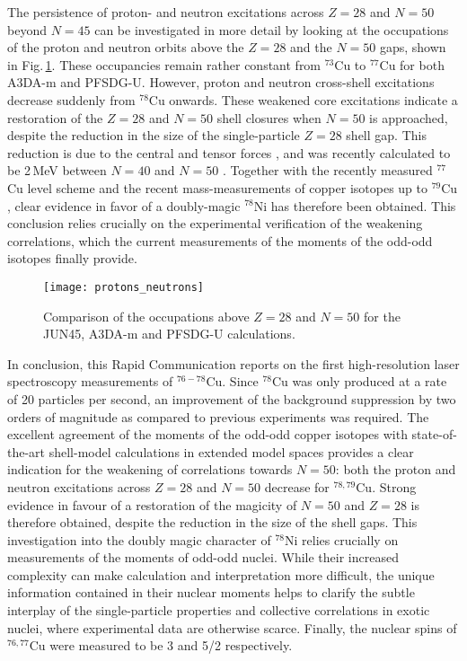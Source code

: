 \documentclass[reprint,superscriptaddress,amsmath,amssymb,aps,prl]{revtex4-1}
\begin{document}
The persistence of proton- and neutron excitations across $Z=28$ and $N=50$ beyond $N=45$ can be investigated in more detail by looking at the occupations of the proton and neutron orbits above the $Z=28$ and the $N=50$ gaps, shown in Fig.\,\ref{fig:occupations}. These occupancies remain rather constant from $^{73}$Cu to $^{77}$Cu for both A3DA-m and PFSDG-U. However, proton and neutron cross-shell excitations decrease suddenly from $^{78}$Cu onwards. These weakened core excitations indicate a restoration of the $Z=28$ and $N=50$ shell closures when $N=50$ is approached, despite the reduction in the size of the single-particle $Z=28$ shell gap. This reduction is due to the central and tensor forces \cite{Otsuka2005,Otsuka2010}, and was recently calculated to be 2\,MeV between $N=40$ and $N=50$ \cite{Tsunoda2014,Sahin2017,Welker2017}. Together with the recently measured $^{77}$Cu level scheme \cite{Sahin2017} and the recent mass-measurements of copper isotopes up to $^{79}$Cu \cite{Welker2017}, clear evidence in favor of a doubly-magic $^{78}$Ni has therefore been obtained. This conclusion relies crucially on the experimental verification of the weakening correlations, which the current measurements of the moments of the odd-odd isotopes finally provide.

\begin{figure}[ht!]
    \centering
    \texttt{[image: protons\_neutrons]}
    \caption{Comparison of the occupations above $Z=28$ and $N=50$ for the JUN45, A3DA-m and PFSDG-U calculations.}
    \label{fig:occupations}
\end{figure}

In conclusion, this Rapid Communication reports on the first high-resolution laser spectroscopy measurements of $^{76-78}$Cu. Since $^{78}$Cu was only produced at a rate of 20 particles per second, an improvement of the background suppression by two orders of magnitude as compared to previous experiments was required. The excellent agreement of the moments of the odd-odd copper isotopes with state-of-the-art shell-model calculations in extended model spaces provides a clear indication for the weakening of correlations towards $N=50$: both the proton and neutron excitations across $Z=28$ and $N=50$ decrease for $^{78,79}$Cu. Strong evidence in favour of a restoration of the magicity of $N=50$ and $Z=28$ is therefore obtained, despite the reduction in the size of the shell gaps. This investigation into the doubly magic character of $^{78}$Ni relies crucially on measurements of the moments of odd-odd nuclei. While their increased complexity can make calculation and interpretation more difficult, the unique information contained in their nuclear moments helps to clarify the subtle interplay of the single-particle properties and collective correlations in exotic nuclei, where experimental data are otherwise scarce. Finally, the nuclear spins of $^{76,77}$Cu were measured to be 3 and 5/2 respectively.
\end{document}
